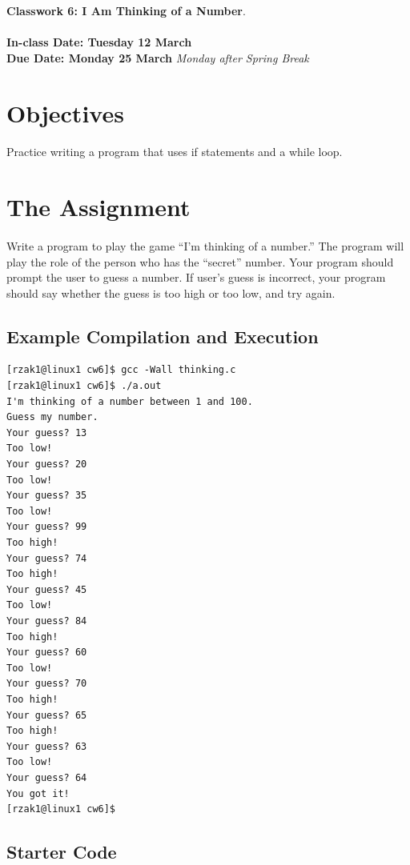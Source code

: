 \documentclass[letter,11pt]{article}
\begin{document}
\huge
\textbf{Classwork 6: I Am Thinking of a Number}.
\normalsize
\\ ~~ \\
\textbf{In-class Date: Tuesday 12 March} \\
\textbf{Due Date: Monday 25 March} \textit{Monday after Spring Break}

\section*{Objectives}
\paragraph{}Practice writing a program that uses if statements and a while loop.

\section*{The Assignment}
\paragraph{}Write a program to play the game ``I'm thinking of a number.'' The program will play the role of the person who has the ``secret'' number. Your program should prompt the user to guess a number. If user's guess is incorrect, your program should say whether the guess is too high or too low, and try again.

\subsection*{Example Compilation and Execution}
\begin{verbatim}
[rzak1@linux1 cw6]$ gcc -Wall thinking.c
[rzak1@linux1 cw6]$ ./a.out
I'm thinking of a number between 1 and 100.
Guess my number.
Your guess? 13
Too low!
Your guess? 20
Too low!
Your guess? 35
Too low!
Your guess? 99
Too high!
Your guess? 74
Too high!
Your guess? 45
Too low!
Your guess? 84
Too high!
Your guess? 60
Too low!
Your guess? 70
Too high!
Your guess? 65
Too high!
Your guess? 63
Too low!
Your guess? 64
You got it!
[rzak1@linux1 cw6]$ 
\end{verbatim}

\subsection*{Starter Code}
\end{document}
